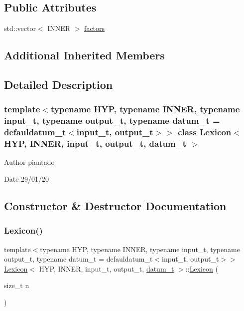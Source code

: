 \subsection*{Public Attributes}
\begin{DoxyCompactItemize}
\item 
std\+::vector$<$ I\+N\+N\+ER $>$ \hyperlink{class_lexicon_ac70865eb23b1e23f53f21e1760adac00}{factors}
\end{DoxyCompactItemize}
\subsection*{Additional Inherited Members}


\subsection{Detailed Description}
\subsubsection*{template$<$typename H\+YP, typename I\+N\+N\+ER, typename input\+\_\+t, typename output\+\_\+t, typename datum\+\_\+t = defauldatum\+\_\+t$<$input\+\_\+t, output\+\_\+t$>$$>$\newline
class Lexicon$<$ H\+Y\+P, I\+N\+N\+E\+R, input\+\_\+t, output\+\_\+t, datum\+\_\+t $>$}

\begin{DoxyAuthor}{Author}
piantado 
\end{DoxyAuthor}
\begin{DoxyDate}{Date}
29/01/20 
\end{DoxyDate}


\subsection{Constructor \& Destructor Documentation}
\mbox{\label{class_lexicon_a06bafc4711d145a026fe03e9e1168ae8}} 
\subsubsection{\texorpdfstring{Lexicon()}{Lexicon()}\hspace{0.1cm}{\footnotesize\ttfamily [1/2]}}
{\footnotesize\ttfamily template$<$typename H\+YP, typename I\+N\+N\+ER, typename input\+\_\+t, typename output\+\_\+t, typename datum\+\_\+t = defauldatum\+\_\+t$<$input\+\_\+t, output\+\_\+t$>$$>$ \\
\hyperlink{class_lexicon}{Lexicon}$<$ H\+YP, I\+N\+N\+ER, input\+\_\+t, output\+\_\+t, \hyperlink{class_bayesable_a9f1a6c0cd7855550fa10b1a8f13a5867}{datum\+\_\+t} $>$\+::\hyperlink{class_lexicon}{Lexicon} (\begin{DoxyParamCaption}\item[{size\+\_\+t}]{n }\end{DoxyParamCaption})\hspace{0.3cm}{\ttfamily [inline]}}

